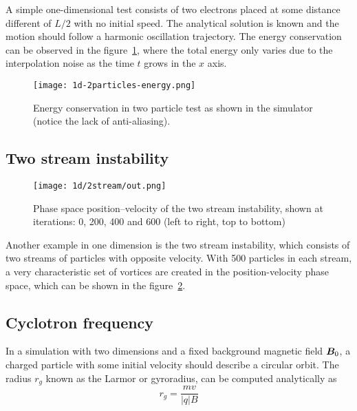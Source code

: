 A simple one-dimensional test consists of two electrons placed at some distance 
different of $L/2$ with no initial speed. The analytical solution is known and 
the motion should follow a harmonic oscillation trajectory. The energy 
conservation can be observed in the figure~\ref{fig:1d-2particles-energy}, where 
the total energy only varies due to the interpolation noise as the time $t$ 
grows in the $x$ axis.
%
\begin{figure}[h]
	\centering
	\texttt{[image: 1d-2particles-energy.png]}
	\caption{Energy conservation in two particle test as shown in the simulator 
	(notice the lack of anti-aliasing).}
	\label{fig:1d-2particles-energy}
\end{figure}

\subsection{Two stream instability}

%
\begin{figure}[ht]
	\centering
	\texttt{[image: 1d/2stream/out.png]}
	\caption{Phase space position--velocity of the two stream instability, shown 
	at iterations: 0, 200, 400 and 600 (left to right, top to bottom)}
	\label{fig:1d-2stream}
\end{figure}

Another example in one dimension is the two stream instability, which consists 
of two streams of particles with opposite velocity. With 500 particles in each 
stream, a very characteristic set of vortices are created in the 
position-velocity phase space, which can be shown in the 
figure~\ref{fig:1d-2stream}.

\subsection{Cyclotron frequency}

In a simulation with two dimensions and a fixed background magnetic field 
$\bm{B}_0$, a charged particle with some initial velocity should describe a circular 
orbit. The radius $r_g$ known as the Larmor or gyroradius, can be computed 
analytically as
\begin{equation}
r_g = \frac{m v}{|q| B}
\end{equation}
